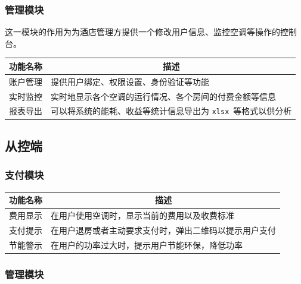 \documentclass[blue,normal,cn]{elegantnote}
\newcommand{\code}[1]{\colorbox{light-gray}{\texttt{#1}}}
\begin{document}
\subsubsection{管理模块}
这一模块的作用为为酒店管理方提供一个修改用户信息、监控空调等操作的控制台。

\begin{center}
	\begin{tabular}{|>{\centering}m{}|m{}|}
		\hline
		\textbf{功能名称} & \multicolumn{1}{c|}{\textbf{描述}}                                \\
		\hline
		账户管理          & 提供用户绑定、权限设置、身份验证等功能                            \\
		\hline
		实时监控          & 实时地显示各个空调的运行情况、各个房间的付费金额等信息            \\
		\hline
		报表导出          & 可以将系统的能耗、收益等统计信息导出为 \code{xlsx} 等格式以供分析 \\
		\hline
	\end{tabular}
\end{center}

\subsection{从控端}

\subsubsection{支付模块}

\begin{center}
	\begin{tabular}{|>{\centering}m{}|m{}|}
		\hline
		\textbf{功能名称} & \multicolumn{1}{c|}{\textbf{描述}}                     \\
		\hline
		费用显示          & 在用户使用空调时，显示当前的费用以及收费标准           \\
		\hline
		支付提示          & 在用户退房或者主动要求支付时，弹出二维码以提示用户支付 \\
		\hline
		节能警示          & 在用户的功率过大时，提示用户节能环保，降低功率         \\
		\hline
	\end{tabular}
\end{center}

\subsubsection{管理模块}
\end{document}
